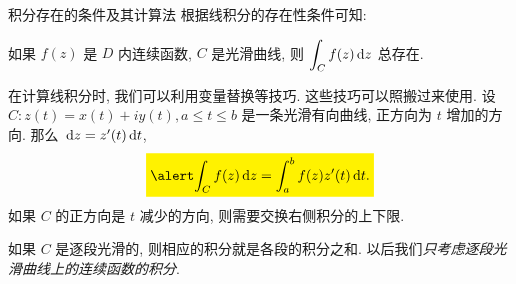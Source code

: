 \begin{frame}{积分存在的条件及其计算法}
\onslide<+->
根据线积分的存在性条件可知:
\begin{theorem}
如果 $f(z)$ 是 $D$ 内连续函数, $C$ 是光滑曲线, 则 $\displaystyle\int_Cf(z)\,\mathrm{d} z$ 总存在.
\end{theorem}
\onslide<+->
在计算线积分时, 我们可以利用变量替换等技巧.
\onslide<+->
这些技巧可以照搬过来使用.
\onslide<+->
设 $C:z(t)=x(t)+iy(t),a\le t\le b$ 是一条光滑有向曲线, 正方向为 $t$ 增加的方向.
\onslide<+->
那么 $\,\mathrm{d} z=z'(t)\,\mathrm{d} t$,
\onslide<+->
\[\aboxeq{\int_Cf(z)\diff z=\int_a^b f(z)z'(t)\diff t.}\]
\onslide<+->
如果 $C$ 的正方向是 $t$ 减少的方向, 则需要交换右侧积分的上下限.

\onslide<+->
如果 $C$ 是逐段光滑的, 则相应的积分就是各段的积分之和.
\onslide<+->
以后我们\emph{只考虑逐段光滑曲线上的连续函数的积分}.
\end{frame}



